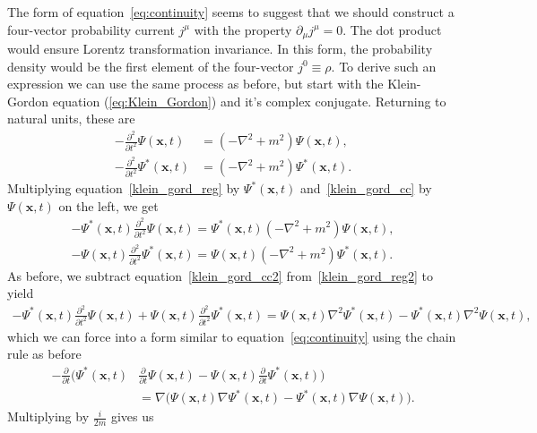 \documentclass[titlepage,letterpaper,onecolumn,11pt,final]{report}
\newcommand{\psxt}{\Psi (\mathbf{x},t)}
\newcommand{\psxs}{\Psi^{*} (\mathbf{x},t)}
\numberwithin{equation}{section}
\numberwithin{figure}{section}
\begin{document}
The form of equation~\ref{eq:continuity} seems to suggest that we should construct a four-vector probability current $j^{\mu}$ with the property $\partial_{\mu} j^{\mu} = 0$. The dot product would ensure Lorentz transformation invariance. In this form, the probability density would be the first element of the four-vector $j^{0} \equiv \rho$. To derive such an expression we can use the same process as before, but start with the Klein-Gordon equation (\ref{eq:Klein_Gordon}) and it's complex conjugate. Returning to natural units, these are
\begin{subequations}
\begin{align}
	\label{klein_gord_reg}
	- \frac{\partial^{2}}{\partial t^{2}} \psxt &= \left( - \nabla^{2} + m^{2} \right) \psxt,\\
	\label{klein_gord_cc}
	- \frac{\partial^{2}}{\partial t^{2}} \psxs &= \left( - \nabla^{2} + m^{2} \right) \psxs.
\end{align}
\end{subequations}
%
Multiplying equation~\ref{klein_gord_reg} by $\psxs$ and~\ref{klein_gord_cc} by $\psxt$ on the left, we get
\begin{subequations}
\begin{gather}
	\label{klein_gord_reg2}
	- \psxs \frac{\partial^{2}}{\partial t^{2}} \psxt = \psxs \left( - \nabla^{2} + m^{2} \right) \psxt,\\
	\label{klein_gord_cc2}
	- \psxt \frac{\partial^{2}}{\partial t^{2}} \psxs = \psxt \left( - \nabla^{2} + m^{2} \right) \psxs.
\end{gather}
\end{subequations}
%
As before, we subtract equation~\ref{klein_gord_cc2} from~\ref{klein_gord_reg2} to yield
\begin{gather}
	- \psxs \frac{\partial^{2}}{\partial t^{2}} \psxt +  \psxt \frac{\partial^{2}}{\partial t^{2}} \psxs =  \psxt \nabla^{2} \psxs - \psxs \nabla^{2} \psxt,
\end{gather}
%
which we can force into a form similar to equation~\ref{eq:continuity} using the chain rule as before
\begin{equation}
	\begin{split}
	- \frac{\partial}{\partial t} \bigg( \psxs & \frac{\partial}{\partial t} \psxt - \psxt \frac{\partial}{\partial t} \psxs \bigg) \\
	&=  \nabla \bigg( \psxt \nabla \psxs - \psxs \nabla \psxt \bigg).
	\end{split}
\end{equation}
%
Multiplying by $\frac{i}{2m}$ gives us
\end{document}
